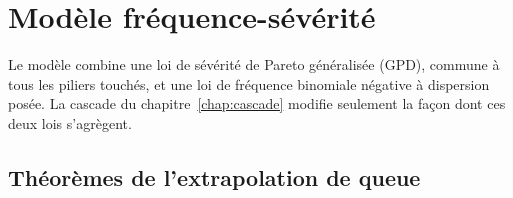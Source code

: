 
\chapter{Modèle fréquence-sévérité}
\label{chap:socle}
\label{part:modele}

\noindent Le modèle combine une loi de sévérité de Pareto généralisée (GPD), commune à tous les
piliers touchés, et une loi de fréquence binomiale négative à dispersion posée.
La cascade du chapitre~\ref{chap:cascade} modifie seulement la façon dont ces deux
lois s'agrègent.



\section{Théorèmes de l'extrapolation de queue}

